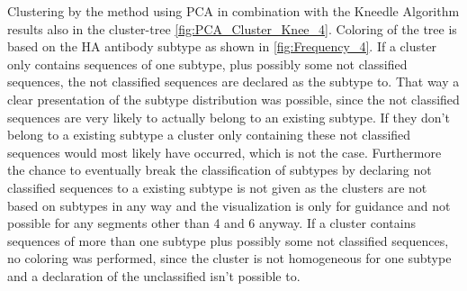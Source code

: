 Clustering by the method using \gls{PCA} in combination with the Kneedle Algorithm results also in the cluster-tree \autoref{fig:PCA_Cluster_Knee_4}. Coloring of the tree is based on the \gls{HA} antibody subtype as shown in \autoref{fig:Frequency_4}. If a cluster only contains sequences of one subtype, plus possibly some not classified sequences, the not classified sequences are declared as the subtype to. That way a clear presentation of the subtype distribution was possible, since the not classified sequences are very likely to actually belong to an existing subtype. If they don't belong to a existing subtype a cluster only containing these not classified sequences would most likely have occurred, which is not the case. Furthermore the chance to eventually break the classification of subtypes by declaring not classified sequences to a existing subtype is not given as the clusters are not based on subtypes in any way and the visualization is only for guidance and not possible for any segments other than 4 and 6 anyway. If a cluster contains sequences of more than one subtype plus possibly some not classified sequences, no coloring was performed, since the cluster is not homogeneous for one subtype and a declaration of the unclassified isn't possible to. 

\begin{table}[!hbt]
    \centering
    \caption[Anomalies in Segment 4 Cluster 29 (\Acrshort{PCA})]{\textbf{Anomalies in Segment 4 Cluster 29 (\Acrshort{PCA}).}.}
    \label{tab:PCA_Error_4_29}
\end{table}


